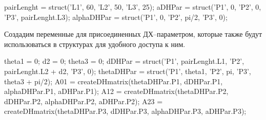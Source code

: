 \documentclass[oneside, final, 14pt]{extarticle}
\begin{document}
{\small \begin{listing}{24}
pairLenght = struct('L1', 60, 'L2', 50, 'L3', 25);
aDHPar = struct('P1', 0, 'P2', 0, 'P3', pairLenght.L3);
alphaDHPar = struct('P1', 0, 'P2', pi/2, 'P3', 0);
\end{listing} 
}
\par

Создадим переменные для присоединенных ДХ--параметром, которые также будут использоваться в структурах для удобного доступа к ним.

{\small \begin{listing}{27}
theta1 = 0;
d2 = 0;
theta3 = 0;
dDHPar = struct('P1', pairLenght.L1, 'P2', pairLenght.L2 + d2, 'P3', 0);
thetaDHPar = struct('P1', theta1, 'P2', pi, 'P3', theta3 + pi/2);
A01 = createDHmatrix(thetaDHPar.P1, dDHPar.P1, alphaDHPar.P1, aDHPar.P1);
A12 = createDHmatrix(thetaDHPar.P2, dDHPar.P2, alphaDHPar.P2, aDHPar.P2);
A23 = createDHmatrix(thetaDHPar.P3, dDHPar.P3, alphaDHPar.P3, aDHPar.P3);
\end{listing} 
}
\par
\end{document}
